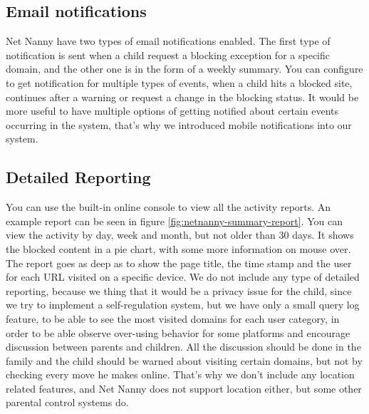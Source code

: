 \subsection{Email notifications}

Net Nanny have two types of email notifications enabled. The first type of notification is sent when a child request a blocking exception for a specific domain, and the other one is in the form of a weekly summary. You can configure to get notification for multiple types of events, when a child hits a blocked site, continues after a warning or request a change in the blocking status. It would be more useful to have multiple options of getting notified about certain events occurring in the system, that's why we introduced mobile notifications into our system.

\subsection{Detailed Reporting}

You can use the built-in online console to view all the activity reports. An example report can be seen in figure \ref{fig:netnanny-summary-report}. You can view the activity by day, week and month, but not older than 30 days. It shows the blocked content in a pie chart, with some more information on mouse over. The report goes as deep as to show the page title, the time stamp and the user for each URL visited on a specific device. We do not include any type of detailed reporting, because we thing that it would be a privacy issue for the child, since we try to implement a self-regulation system, but we have only a small query log feature, to be able to see the most visited domains for each user category, in order to be able observe over-using behavior for some platforms and encourage discussion between parents and children. All the discussion should be done in the family and the child should be warned about visiting certain domains, but not by checking every move he makes online. That's why we don't include any location related features, and Net Nanny does not support location either, but some other parental control systems do.

